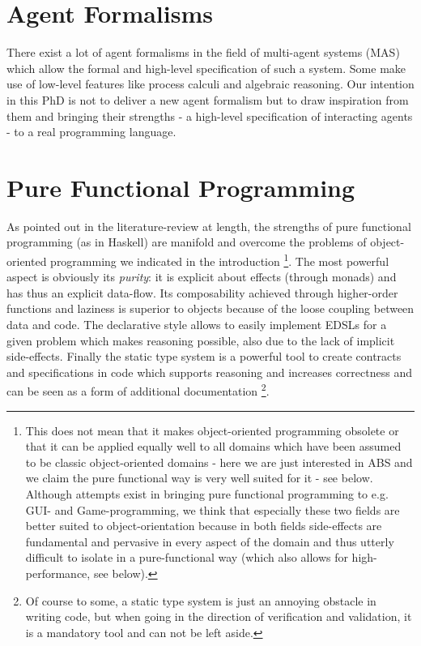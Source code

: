 \section{Agent Formalisms}
There exist a lot of agent formalisms in the field of multi-agent systems (MAS) which allow the formal and high-level specification of such a system. Some make use of low-level features like process calculi and algebraic reasoning. Our intention in this PhD is not to deliver a new agent formalism but to draw inspiration from them and bringing their strengths - a high-level specification of interacting agents - to a real programming language. 

\section{Pure Functional Programming}
As pointed out in the literature-review at length, the strengths of pure functional programming (as in Haskell) are manifold and overcome the problems of object-oriented programming we indicated in the introduction \footnote{This does not mean that it makes object-oriented programming obsolete or that it can be applied equally well to all domains which have been assumed to be classic object-oriented domains - here we are just interested in ABS and we claim the pure functional way is very well suited for it - see below. Although attempts exist in bringing pure functional programming to e.g. GUI- and Game-programming, we think that especially these two fields are better suited to object-orientation because in both fields side-effects are fundamental and pervasive in every aspect of the domain and thus utterly difficult to isolate in a pure-functional way (which also allows for high-performance, see below).}. The most powerful aspect is obviously its \textit{purity}: it is explicit about effects (through monads) and has thus an explicit data-flow. Its composability achieved through higher-order functions and laziness is superior to objects because of the loose coupling between data and code. The declarative style allows to easily implement EDSLs for a given problem which makes reasoning possible, also due to the lack of implicit side-effects. Finally the static type system is a powerful tool to create contracts and specifications in code which supports reasoning and increases correctness and can be seen as a form of additional documentation \footnote{Of course to some, a static type system is just an annoying obstacle in writing code, but when going in the direction of verification and validation, it is a mandatory tool and can not be left aside.}.

